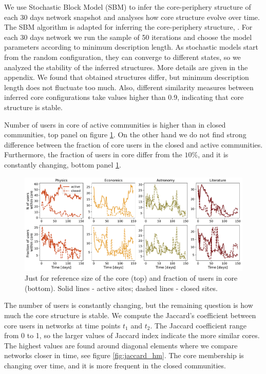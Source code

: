 We use Stochastic Block Model (SBM) to infer the core-periphery structure of each 30 days network snapshot and analyses how core structure evolve over time.  The  SBM algorithm is adapted for inferring the core-periphery structure, \cite{gallagher2020clarified}. For each 30 days network we run the sample of 50 iterations and choose the model parameters according to minimum description length. As stochastic models start from the random configuration, they can converge to different states, so we analyzed the stability of the inferred structures. More details are given in the appendix. We found that obtained structures differ, but minimum description length does not fluctuate too much. Also, different similarity measures between inferred core configurations take values higher than 0.9, indicating that core structure is stable. 

Number of users in core of active communities is higher than in closed communities, top panel on figure \ref{fig:core_size}. On the other hand we do not find strong difference between the fraction of core users in the closed and active communities. Furthermore, the fraction of users in core differ from the $10\%$, and it is constantly changing, bottom panel \ref{fig:core_size}. 

\begin{figure}[h!]
	\centering
	\includegraphics[width=\linewidth]{figures/stackexchange/core_users.pdf}
	\caption{Just for reference size of the core (top) and fraction of users in core (bottom). Solid lines - active sites; dashed lines - closed sites.}
	\label{fig:core_size}
\end{figure}

The number of users is constantly changing, but the remaining question is how much the core structure is stable. We compute the Jaccard's coefficient between core users in networks at time points $t_1$ and $t_2$. The Jaccard coefficient range from 0 to 1, so the larger values of Jaccard index indicate the more similar cores. 
The highest values are found around diagonal elements where we compare networks closer in time, see figure \ref{fig:jaccard_hm}. The core membership is changing over time, and it is more frequent in the closed communities. 

